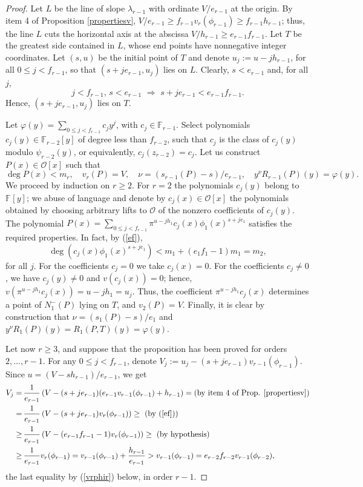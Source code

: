 \documentclass{amsart}
\def\op{\operatorname}
\def\dg{\op{deg}}
\def\ff#1{\mathbb{F}_{#1}}
\def\imp{\,\Longrightarrow\,}
\def\la{\lambda}
\def\oo{{\mathcal O}}
\def\zpx{\oo[x]}
\begin{document}
\begin{proof}
Let $L$ be the line of slope $\la_{r-1}$ with ordinate $V/e_{r-1}$ at the origin. By item 4 of Proposition \ref{propertiesv}, 
$V/e_{r-1}\ge f_{r-1}v_r(\phi_{r-1})\ge f_{r-1}h_{r-1}$; thus, the line $L$ cuts the horizontal axis at the abscissa $V/h_{r-1}\ge e_{r-1}f_{r-1}$. Let $T$ be the greatest side contained in $L$, whose end points have nonnegative integer coordinates. Let $(s,u)$ be the initial point of $T$ and denote $u_j:=u-jh_{r-1}$, for all $0\le j<f_{r-1}$, so that $(s+je_{r-1},u_j)$ lies on $L$. Clearly, $s<e_{r-1}$ and, for all $j$,
\begin{equation}\label{ef}
 j<f_{r-1},\,s<e_{r-1}\,\imp\,s+je_{r-1}<e_{r-1}f_{r-1}.
\end{equation}
Hence, $(s+je_{r-1},u_j)$ lies on $T$. 

Let $\varphi(y)=\sum_{0\le j<f_{r-1}}c_jy^j$, with $c_j\in\ff{r-1}$.
Select polynomials $c_j(y)\in\ff{r-2}[y]$ of degree less than $f_{r-2}$, such that $c_j$ is the class of $c_j(y)$ modulo $\psi_{r-2}(y)$, or equivalently, $c_j(z_{r-2})=c_j$. Let us construct $P(x)\in\zpx$ such that
$$
\dg P(x)<m_r,\quad v_r(P)=V,\quad \nu=(s_{r-1}(P)-s)/e_{r-1},\quad y^{\nu}R_{r-1}(P)(y)=\varphi(y) .
$$
We proceed by induction  on $r\ge 2$. For $r=2$ the polynomials $c_j(y)$ belong to $\ff{}[y]$; we abuse of language and denote by $c_j(x)\in\oo[x]$ the polynomials obtained by choosing arbitrary lifts to $\oo$ of the nonzero coefficients of $c_j(y)$. The polynomial
 $P(x)=\sum_{0\le j<f_{r-1}} \pi^{u-jh_1}c_j(x)\phi_1(x)^{s+je_1}$ satisfies the required properties. In fact, by (\ref{ef}),
$$\dg (c_j(x)\phi_1(x)^{s+je_1})<m_1+(e_1f_1-1)m_1=m_2,$$ for all $j$.
For the coefficients $c_j=0$ we take $c_j(x)=0$. For the coefficients $c_j\ne0$, we have $c_j(y)\ne 0$ and $v(c_j(x))=0$; hence, $v(\pi^{u-jh_1}c_j(x))=u-jh_1=u_j$. Thus, the coefficient $\pi^{u-jh_1}c_j(x)$ determines a point of $N_1^-(P)$ lying on $T$, and $v_2(P)=V$. Finally, it is clear by construction that $\nu=(s_1(P)-s)/e_1$ and $y^{\nu}R_1(P)(y)=R_1(P,T)(y)=\varphi(y)$.

Let now $r\ge 3$, and suppose that the proposition has been proved for orders $2,\dots,r-1$. For any $0\le j<f_{r-1}$, denote $V_j:=u_j-(s+je_{r-1})v_{r-1}(\phi_{r-1})$. Since $u=(V-sh_{r-1})/e_{r-1}$, we get
\begin{align*}
V_j=&\,\frac 1{e_{r-1}}\left(V-(s+je_{r-1})(e_{r-1}v_{r-1}(\phi_{r-1})+h_{r-1}\right)=(\mbox{by item 4 of Prop. \ref{propertiesv}})\\
=&\,\frac 1{e_{r-1}}\left(V-(s+je_{r-1})v_r(\phi_{r-1})\right)\ge\  (\mbox{by }(\ref{ef})) \\
\ge&\,\frac 1{e_{r-1}}\left(V-(e_{r-1}f_{r-1}-1)v_r(\phi_{r-1})\right)\ge\  (\mbox{by hypothesis})\\
\ge&\,\frac 1{e_{r-1}}v_r(\phi_{r-1})=v_{r-1}(\phi_{r-1})+\dfrac{h_{r-1}}{e_{r-1}}>v_{r-1}(\phi_{r-1})=e_{r-2}f_{r-2}v_{r-1}(\phi_{r-2}),  \end{align*}
the last equality by (\ref{vrphir}) below, in order $r-1$.


\end{proof}
\end{document}
